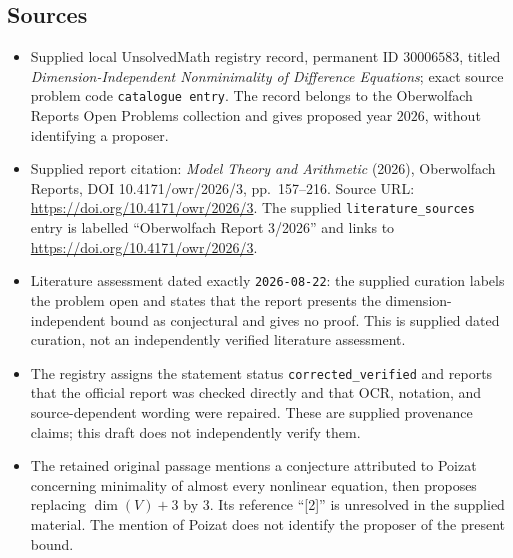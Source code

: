 \documentclass[11pt]{article}
\begin{document}
\subsection{Sources}
\begin{itemize}
\item Supplied local UnsolvedMath registry record, permanent ID \(30006583\), titled \emph{Dimension-Independent Nonminimality of Difference Equations}; exact source problem code \texttt{catalogue entry}. The record belongs to the Oberwolfach Reports Open Problems collection and gives proposed year \(2026\), without identifying a proposer.
\item Supplied report citation: \emph{Model Theory and Arithmetic} (2026), Oberwolfach Reports, DOI 10.4171/owr/2026/3, pp.\ 157--216. Source URL: \url{https://doi.org/10.4171/owr/2026/3}. The supplied \texttt{literature\_sources} entry is labelled ``Oberwolfach Report 3/2026'' and links to \url{https://doi.org/10.4171/owr/2026/3}.
\item Literature assessment dated exactly \texttt{2026-08-22}: the supplied curation labels the problem open and states that the report presents the dimension-independent bound as conjectural and gives no proof. This is supplied dated curation, not an independently verified literature assessment.
\item The registry assigns the statement status \texttt{corrected\_verified} and reports that the official report was checked directly and that OCR, notation, and source-dependent wording were repaired. These are supplied provenance claims; this draft does not independently verify them.
\item The retained original passage mentions a conjecture attributed to Poizat concerning minimality of almost every nonlinear equation, then proposes replacing \(\dim(V)+3\) by \(3\). Its reference ``[2]'' is unresolved in the supplied material. The mention of Poizat does not identify the proposer of the present bound.
\end{itemize}
\end{document}
